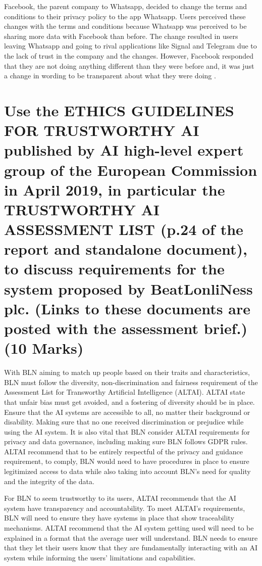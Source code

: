 \documentclass[a4paper,10pt]{article}
\begin{document}
Facebook, the parent company to Whatsapp, decided to change the terms and conditions to their privacy policy to the app Whatsapp. Users perceived these changes with the terms and conditions because Whatsapp was perceived to be sharing more data with Facebook than before. The change resulted in users leaving Whatsapp and going to rival applications like Signal and Telegram due to the lack of trust in the company and the changes. However, Facebook responded that they are not doing anything different than they were before and, it was just a change in wording to be transparent about what they were doing  \cite{whatsapp_fb_data}.

	
\section{Use the ETHICS GUIDELINES FOR TRUSTWORTHY AI published by AI high-level expert group of the European Commission in April 2019, in particular the TRUSTWORTHY AI ASSESSMENT LIST (p.24 of the report and standalone document), to discuss requirements for the system proposed by BeatLonliNess plc. (Links to these documents are posted with the assessment brief.) (10 Marks)}

	With BLN aiming to match up people based on their traits and characteristics, BLN must follow the diversity, non-discrimination and fairness requirement of the Assessment List for Transworthy Artificial Intelligence (ALTAI).  ALTAI state that unfair bias must get avoided, and a fostering of diversity should be in place. Ensure that the AI systems are accessible to all, no matter their background or disability. Making sure that no one received discrimination or prejudice while using the AI system. It is also vital that BLN consider ALTAI  requirements for privacy and data governance, including making sure BLN follows GDPR rules. ALTAI recommend that to be entirely respectful of the privacy and guidance requirement, to comply, BLN would need to have procedures in place to ensure legitimized access to data while also taking into account BLN's need for quality and the integrity of the data.
	
	For BLN to seem trustworthy to its users, ALTAI recommends that the AI system have transparency and accountability. To meet ALTAI's requirements, BLN will need to ensure they have systems in place that show traceability mechanisms. ALTAI recommend that the AI system getting used will need to be explained in a format that the average user will understand. BLN needs to ensure that they let their users know that they are fundamentally interacting with an AI system while informing the users' limitations and capabilities.
	
\end{document}

